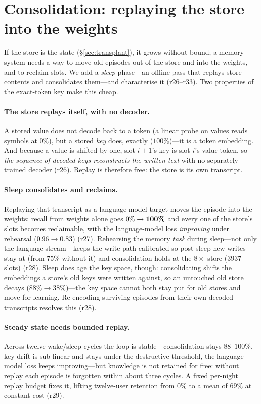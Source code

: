 \section{Consolidation: replaying the store into the weights}
\label{sec:sleep}

If the store is the state (\S\ref{sec:transplant}), it grows without bound; a memory
system needs a way to move old episodes out of the store and into the weights, and to
reclaim slots. We add a \emph{sleep} phase---an offline pass that replays store contents
and consolidates them---and characterise it (r26--r33). Two properties of the exact-token
key make this cheap.

\paragraph{The store replays itself, with no decoder.} A stored value does not decode
back to a token (a linear probe on values reads symbols at $0\%$), but a stored
\emph{key} does, exactly ($100\%$)---it is a token embedding. And because a value is
shifted by one, slot $i{+}1$'s key is slot $i$'s value token, so \emph{the sequence of
decoded keys reconstructs the written text} with no separately trained decoder (r26).
Replay is therefore free: the store is its own transcript.

\paragraph{Sleep consolidates and reclaims.} Replaying that transcript as a
language-model target moves the episode into the weights: recall from weights alone goes
$0\%\to\textbf{100\%}$ and every one of the store's slots becomes reclaimable, with the
language-model loss \emph{improving} under rehearsal ($0.96\to0.83$) (r27). Rehearsing
the memory \emph{task} during sleep---not only the language stream---keeps the write path
calibrated so post-sleep new writes stay at  (from $75\%$ without it) and
consolidation holds at the $8\times$ store ($3937$ slots) (r28). Sleep does age the key
space, though: consolidating shifts the embeddings a store's old keys were written
against, so an untouched old store decays ($88\%\to38\%$)---the key space cannot both
stay put for old stores and move for learning. Re-encoding surviving episodes from their
own decoded transcripts resolves this (r28).

\paragraph{Steady state needs bounded replay.} Across twelve wake/sleep cycles the loop
is stable---consolidation stays $88$--$100\%$, key drift is sub-linear and stays under
the destructive threshold, the language-model loss keeps improving---but knowledge is
not retained for free: without replay each episode is forgotten within about three
cycles. A fixed per-night replay budget fixes it, lifting twelve-user retention from
$0\%$ to a mean of $69\%$ at constant cost (r29).

